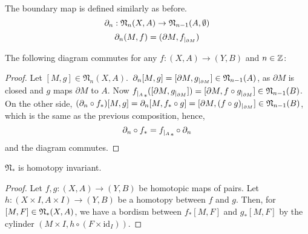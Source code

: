 \documentclass[a4paper,12pt]{article}
\begin{document}
The boundary map is defined similarly as before.
\[\partial_n:\mathfrak{N}_n(X,A)\to\mathfrak{N}_{n-1}(A,\emptyset)\]
\[\partial_n(M, f)=(\partial M,f_{|_{\partial M}})\]

\begin{lemma}\label{naturality}
    The following diagram commutes for any \(f:(X,A)\to(Y,B)\) and \(n\in\mathbb{Z}\): %
    \begin{center}
    \end{center}
\end{lemma}

\begin{proof}
    Let \([M,g]\in\mathfrak{N}_n(X,A)\).\ \(\partial_n[M,g]=[\partial M, g_{|_{\partial M}}]\in\mathfrak{N}_{n-1}(A)\), as \(\partial M\) is closed and \(g\) maps \(\partial M\) to \(A\). %
    Now \({f_{|_{A}}}_\ast([\partial M,g_{|_{\partial M}}])=[\partial M,f\circ g_{|_{\partial M}}]\in \mathfrak{N}_{n-1}(B)\).\\
    On the other side, \((\partial_n\circ f_\ast)[M,g]=\partial_n [M,f_\ast\circ g]=[\partial M,(f\circ g)_{|_{\partial M}}]\in \mathfrak{N}_{n-1}(B)\), which is the same as the previous composition, hence,
    \[\partial_n\circ f_\ast={f_{|_{A}}}_\ast\circ \partial_n\]
    and the diagram commutes.
\end{proof}

\begin{lemma}\cite[II, Satz 3.1]{brocker}\label{htpy inv}
    \(\mathfrak{N}_\ast\) is homotopy invariant.
\end{lemma}

\begin{proof}\cite{brocker}\cite[Chapter I, 5.5]{conner}
    Let \(f,g:(X,A)\to(Y,B)\) be homotopic maps of pairs. Let \(h:(X\times I,A\times I)\to (Y,B)\) be a homotopy between \(f\) and \(g\). Then, for \([M,F]\in\mathfrak{N}_\ast(X,A)\), we have a bordism between \(f_\ast[M,F]\) and \(g_\ast[M,F]\) by the cylinder \((M\times I, h\circ (F\times\mathrm{id}_I))\).
\end{proof}
\end{document}
